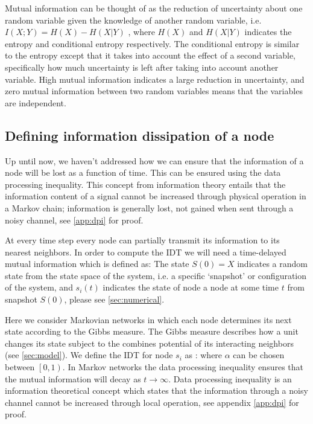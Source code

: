 \documentclass[twoside, twocolumn]{article}
\begin{document}
	Mutual information can be thought of as the reduction of uncertainty about one random variable given the knowledge of another random variable, i.e. $I(X;Y) = H(X) - H(X \vert Y)$ , where $H(X)$ and $H(X\vert Y)$ indicates the entropy and conditional entropy respectively. The conditional entropy is similar to the entropy except that it takes into  account the effect of a second variable, specifically how much uncertainty is left after taking into account another variable. High mutual information indicates a large reduction in uncertainty, and zero mutual information between two random variables means that the variables are independent.

	\subsection{Defining information dissipation of a node}
	Up until now, we haven't addressed how we can ensure that the information of a node will be lost as a function of time. This can be ensured using the data processing inequality. This concept from information theory entails that the information content of a signal cannot be increased through physical operation in a Markov chain; information is generally lost, not gained when sent through a noisy channel, see \ref{app:dpi} for proof.

	At every time step every node can partially transmit its information to its nearest neighbors. In order to compute the IDT we will need a time-delayed mutual information which is defined as:
	The state $S(0) = X$ indicates a random state from the state space of the system, i.e. a specific `snapshot' or configuration of the system, and $s_i(t)$ indicates the state of node a node at some time $t$ from snapshot $S(0)$, please see \ref{sec:numerical}.

	Here we consider Markovian networks in which each node determines its next state according to the Gibbs measure. The Gibbs measure describes how a unit changes its state subject to the combines potential of its interacting neighbors (see \ref{sec:model}). We define the IDT for node $s_i$ as :
	where $\alpha$ can be chosen between $\left[ 0, 1 \right)$. In Markov networks the data processing inequality ensures that the mutual information will decay as $t \rightarrow \infty$. Data processing inequality is an information theoretical concept which states that the information through a noisy channel cannot be increased through local operation, see appendix \ref{app:dpi} for proof.
\end{document}
